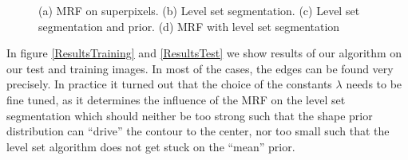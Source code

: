 \documentclass{article} %
\begin{document}
\begin{figure}[htbp]
{ }  
\caption{(a)  MRF on superpixels. (b) Level set segmentation. (c) Level set segmentation and prior.  (d) MRF with level set segmentation}
\label{Individualresults}
 \end{figure}


In figure \ref{ResultsTraining} and \ref{ResultsTest} we show results of our algorithm on our test and training images. In most of the cases, the edges can be found very precisely. In practice it turned out that the choice of the constants $\lambda$ needs to be fine tuned, as it determines the influence of the MRF on the level set segmentation which should neither be too strong such that the shape prior distribution can ``drive'' the contour to the center, nor too small such that the level set algorithm does not get stuck on the ``mean'' prior. 
\end{document}
